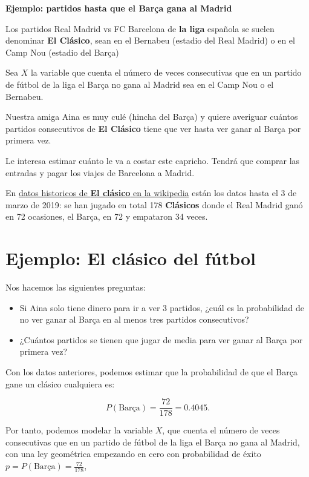 \documentclass[
  letterpaper,
  DIV=11,
  numbers=noendperiod]{scrreprt}
\providecommand{\tightlist}{%
  \setlength{\itemsep}{0pt}\setlength{\parskip}{0pt}}\usepackage{longtable,booktabs,array}
\begin{document}
\textbf{Ejemplo: partidos hasta que el Barça gana al Madrid}

Los partidos Real Madrid vs FC Barcelona de \textbf{la liga} española se
suelen denominar \textbf{El Clásico}, sean en el Bernabeu (estadio del
Real Madrid) o en el Camp Nou (estadio del Barça)

Sea \(X\) la variable que cuenta el número de veces consecutivas que en
un partido de fútbol de la liga el Barça no gana al Madrid sea en el
Camp Nou o el Bernabeu.

Nuestra amiga Aina es muy culé (hincha del Barça) y quiere averiguar
cuántos partidos consecutivos de \textbf{El Clásico} tiene que ver hasta
ver ganar al Barça por primera vez.

Le interesa estimar cuánto le va a costar este capricho. Tendrá que
comprar las entradas y pagar los viajes de Barcelona a Madrid.

En \href{https://es.wikipedia.org/wiki/El_Cl\%C3\%A1sico}{datos
historicos de \textbf{El clásico} en la wikipedia} están los datos hasta
el 3 de marzo de 2019: se han jugado en total 178 \textbf{Clásicos}
donde el Real Madrid ganó en 72 ocasiones, el Barça, en 72 y empataron
34 veces.

\section{Ejemplo: El clásico del
fútbol}\label{ejemplo-el-cluxe1sico-del-fuxfatbol-1}

Nos hacemos las siguientes preguntas:

\begin{itemize}
\tightlist
\item
  Si Aina solo tiene dinero para ir a ver 3 partidos, ¿cuál es la
  probabilidad de no ver ganar al Barça en al menos tres partidos
  consecutivos?
\item
  ¿Cuántos partidos se tienen que jugar de media para ver ganar al Barça
  por primera vez?
\end{itemize}

Con los datos anteriores, podemos estimar que la probabilidad de que el
Barça gane un clásico cualquiera es:

\[P(\mbox{Barça})=\frac{72}{178}=0.4045.\]

Por tanto, podemos modelar la variable \(X\), que cuenta el número de
veces consecutivas que en un partido de fútbol de la liga el Barça no
gana al Madrid, con una ley geométrica empezando en cero con
probabilidad de éxito \(p=P(\mbox{Barça})=\frac{72}{178}\),
\end{document}
